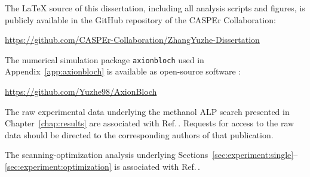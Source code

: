 The \LaTeX{} source of this dissertation, including all analysis scripts and figures, is publicly available in the GitHub repository of the CASPEr Collaboration:
\begin{center}
    \url{https://github.com/CASPEr-Collaboration/ZhangYuzhe-Dissertation}
\end{center}

The numerical simulation package \texttt{axionbloch} used in Appendix~\ref{app:axionbloch} is available as open-source software \cite{Zhang2026_repoAxionBloch}:
\begin{center}
    \url{https://github.com/Yuzhe98/AxionBloch}
\end{center}

The raw experimental data underlying the methanol ALP search presented in Chapter~\ref{chap:results} are associated with Ref.\,\cite{Walter2024_LFthermal}. Requests for access to the raw data should be directed to the corresponding authors of that publication.

The scanning-optimization analysis underlying Sections~\ref{sec:experiment:single}--\ref{sec:experiment:optimization} is associated with Ref.\,\cite{Yuzhe2023_FrequencyScanning}.
